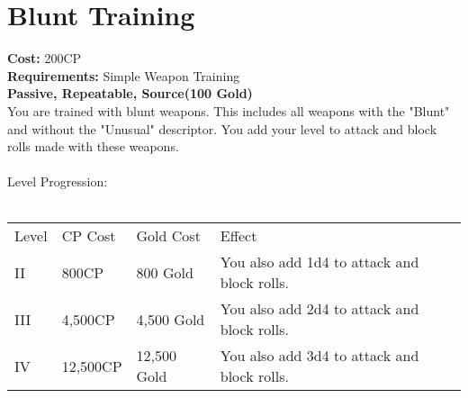 \section{Blunt Training}\label{perk:bluntTraining}
\textbf{Cost:} 200CP\\
\textbf{Requirements:} Simple Weapon Training\\
\textbf{Passive, Repeatable, Source(100 Gold)}\\
You are trained with blunt weapons.
This includes all weapons with the "Blunt" and without the "Unusual" descriptor.
You add your level to attack and block rolls made with these weapons.\\
\\
Level Progression:\\
\\
\begin{tabular}{l | l | l | l}
	Level & CP Cost & Gold Cost & Effect\\
	II & 800CP & 800 Gold & You also add 1d4 to attack and block rolls.\\
	III & 4,500CP & 4,500 Gold & You also add 2d4 to attack and block rolls.\\
	IV & 12,500CP & 12,500 Gold & You also add 3d4 to attack and block rolls.\\
\end{tabular}
